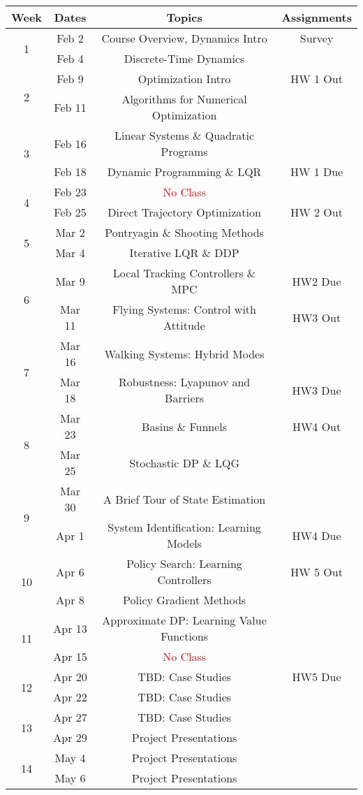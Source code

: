\documentclass[11pt,letterpaper]{article}
\begin{document}
\begin{tabular}{c|c|c|c}
	Week & Dates & Topics & Assignments \\
	\hline
	\multirow{2}{*}{1} & Feb 2 & Course Overview, Dynamics Intro & Survey \\
	 & Feb 4 & Discrete-Time Dynamics &  \\
	\hline
	\multirow{2}{*}{2} & Feb 9 & Optimization Intro & HW 1 Out \\
	 & Feb 11 & Algorithms for Numerical Optimization &  \\
	\hline
	\multirow{2}{*}{3}  & Feb 16 & Linear Systems \& Quadratic Programs &  \\
	 & Feb 18 & Dynamic Programming \& LQR & HW 1 Due \\
	\hline
	\multirow{2}{*}{4}  & Feb 23 & \textcolor{red}{No Class} &  \\
	 & Feb 25 & Direct Trajectory Optimization & HW 2 Out \\
	\hline
	\multirow{2}{*}{5}  & Mar 2 & Pontryagin \& Shooting Methods & \\
	 & Mar 4 & Iterative LQR \& DDP &  \\
	\hline
	\multirow{2}{*}{6}  & Mar 9 & Local Tracking Controllers \& MPC &   HW2 Due \\
	 & Mar 11 & Flying Systems: Control with Attitude & HW3 Out \\
	\hline
	\multirow{2}{*}{7}  & Mar 16 & Walking Systems: Hybrid Modes  & \\
	 & Mar 18 & Robustness: Lyapunov and Barriers & HW3 Due\\
	\hline
	\multirow{2}{*}{8}  & Mar 23 & Basins \& Funnels &  HW4 Out\\
	 & Mar 25 & Stochastic DP \& LQG &   \\
	\hline
	\multirow{2}{*}{9}  & Mar 30 & A Brief Tour of State Estimation &  \\
	 & Apr 1 & System Identification: Learning Models &  HW4 Due \\
	\hline
	\multirow{2}{*}{10}  & Apr 6 & Policy Search: Learning Controllers &  HW 5 Out \\
	 & Apr 8 & Policy Gradient Methods &   \\
	 \hline
	\multirow{2}{*}{11}  & Apr 13 & Approximate DP: Learning Value Functions &  \\
	 & Apr 15 & \textcolor{red}{No Class} &   \\
	 \hline
	\multirow{2}{*}{12}  & Apr 20 & TBD: Case Studies &  HW5 Due \\
	 & Apr 22 & TBD: Case Studies &   \\
	 \hline
	\multirow{2}{*}{13}  & Apr 27 & TBD: Case Studies &  \\
	 & Apr 29 & Project Presentations &   \\
	 \hline
	\multirow{2}{*}{14}  & May 4 & Project Presentations &  \\
	 & May 6 & Project Presentations &   \\
\end{tabular}
\end{document}
